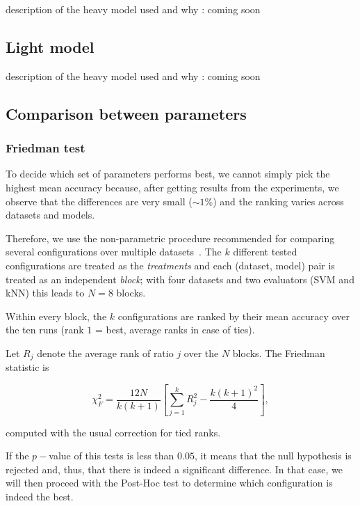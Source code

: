 \documentclass[12pt, openany]{article}
\begin{document}
{\color{blue}
description of the heavy model used and why : coming soon
}

\subsection{Light model}\label{sec:ligh_model}

{\color{blue}
description of the heavy model used and why : coming soon
}


\subsection{Comparison between parameters}\label{sec:friedman}

\subsubsection{Friedman test}

To decide which set of parameters performs best, we cannot simply pick the highest mean accuracy because, after getting results from the experiments, we observe that the differences are very small ($\sim 1\%$) and the ranking varies across datasets and models.

Therefore, we use the non-parametric procedure recommended for comparing several configurations over multiple datasets~\cite{demsar2006statistical}. The $k$ different tested configurations are treated as the \emph{treatments} and each (dataset, model) pair is treated as an independent \emph{block}; with four datasets and two evaluators (SVM and kNN) this leads to $N=8$ blocks.

Within every block, the $k$ configurations are ranked by their mean accuracy over the ten runs (rank $1$ = best, average ranks in case of ties).

Let $R_j$ denote the average rank of ratio $j$ over the $N$ blocks. The Friedman statistic is

\begin{equation}\label{eq:friedman}
    \chi_F^2 = \frac{12N}{k(k+1)}\left[\sum_{j=1}^{k} R_j^2 - \frac{k(k+1)^2}{4}\right],
\end{equation}

computed with the usual correction for tied ranks.

If the $p-$value of this tests is less than $0.05$, it means that the null hypothesis is rejected and, thus, that there is indeed a significant difference. In that case, we will then proceed with the Post-Hoc test to determine which configuration is indeed the best.
\end{document}
